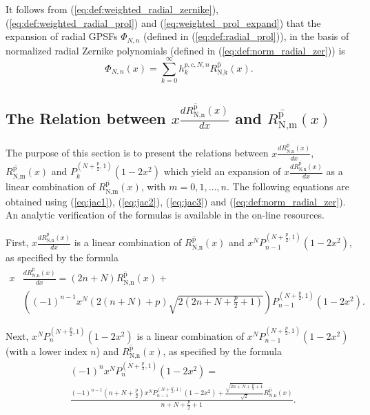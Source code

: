 \documentclass[12pt]{article}
\begin{document}
It follows from (\ref{eq:def:weighted_radial_zernike}), (\ref{eq:def:weighted_radial_prol}) and (\ref{eq:weighted_prol_expand}) that the expansion of radial GPSFs $\Phi_{N,n}$ (defined in (\ref{eq:def:radial_prol})), in the basis of normalized radial Zernike polynomials (defined in (\ref{eq:def:norm_radial_zer})) is
\begin{equation}\label{eq:prol_expand}
  \Phi_{N,n}(x) = \sum_{k=0}^{\infty} {h}^{p,c,N,n}_k \overline{R_{\text{N,k}}^{\text{p}}}(x) .
\end{equation}




%
%
%
\subsection{The Relation between $x \frac{{d} \overline{R_{\text{N,n}}^{\text{p}}}(x)}{{d} x}$ and $\overline{R_{\text{N,m}}^{\text{p}}}(x)$ }\label{sec:xdR}

The purpose of this section is to present the relations between $x \frac{{d} \overline{R_{\text{N,n}}^{\text{p}}}(x)}{{d} x}$, 
$\overline{R_{\text{N,m}}^{\text{p}}}(x)$ and $P_{k}^{\left(N+\frac{p}{2},1\right)}\left(1-2 x^2\right)$ which yield an expansion of 
$x \frac{{d} \overline{R_{\text{N,n}}^{\text{p}}}(x)}{{d} x}$ as a linear combination of $\overline{R_{\text{N,m}}^{\text{p}}}(x)$,
with $m=0,1,\ldots,n$.
The following equations are obtained using (\ref{eq:jac1}), (\ref{eq:jac2}), (\ref{eq:jac3}) and (\ref{eq:def:norm_radial_zer}).
An analytic verification of the formulas is available in the on-line resources. 

First, $x \frac{{d} \overline{R_{\text{N,n}}^{\text{p}}}(x)}{{d} x}$ is a linear combination of $\overline{R_{\text{N,n}}^{\text{p}}}(x)$
and $x^N  P_{n-1}^{\left(N+\frac{p}{2},1\right)}\left(1-2 x^2\right)$, as specified by the formula
\begin{equation}
\begin{split}
x &\frac{{d} \overline{R_{\text{N,n}}^{\text{p}}}(x)}{{d} x} = (2 n+N) \overline{R_{\text{N,n}}^{\text{p}}}(x) + \\
 & \left((-1)^{n-1} x^N (2 (n+N)+p) \sqrt{2 \left(2 n+N+\frac{p}{2}+1\right)}\right) P_{n-1}^{\left(N+\frac{p}{2},1\right)}\left(1-2 x^2\right).
\end{split}
\end{equation}

Next, $x^N P_n^{\left(N+\frac{p}{2},1\right)}\left(1-2 x^2\right)$ is a linear combination of $x^N P_{n-1}^{\left(N+\frac{p}{2},1\right)}\left(1-2 x^2\right)$ (with a lower index $n$) and $\overline{R_{\text{N,n}}^{\text{p}}}(x)$, as specified by the formula
\begin{equation}
\begin{split}
&(-1)^n x^N  P_n^{\left(N+\frac{p}{2},1\right)}\left(1-2 x^2\right)= \\
& \frac{(-1)^{n-1} \left(n+N+\frac{p}{2}\right) x^N P_{n-1}^{\left(N+\frac{p}{2},1\right)}\left(1-2 x^2\right)
   +\frac{ \sqrt{2 n+N+\frac{p}{2}+1}}{\sqrt{2}} \overline{R_{\text{N,n}}^{\text{p}}}(x)}{n+N+\frac{p}{2}+1}.
\end{split}
\end{equation}
\end{document}

